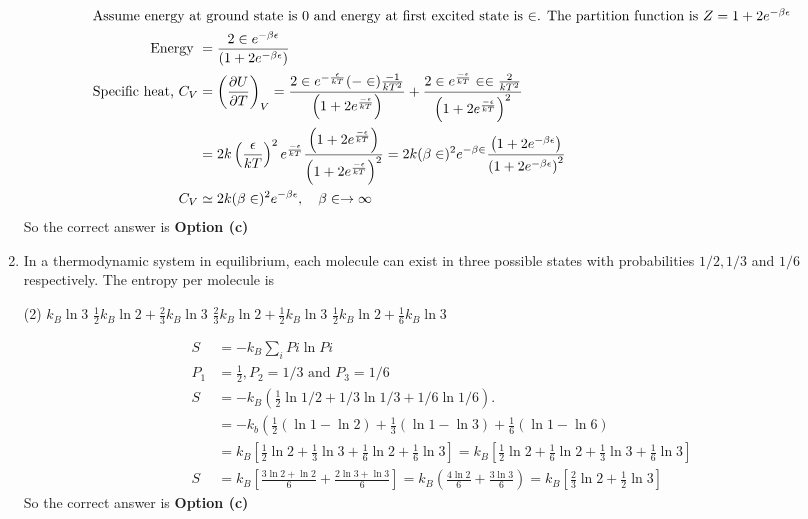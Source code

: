 \begin{enumerate}
\begin{answer}
\begin{align*}
	\intertext{Assume energy at ground state is 0 and energy at first excited state is $\in$. The partition function is $Z=1+2 e^{-\beta \epsilon}$}
\text{	Energy }&=\frac{2 \in e^{-\beta \epsilon}}{\left(1+2 e^{-\beta \epsilon}\right)}\\
	\text{Specific heat, }C_{V}&=\left(\frac{\partial U}{\partial T}\right)_{V}=\frac{2 \in e^{-\frac{\epsilon}{k T}}(-\in) \frac{-1}{k T^{2}}}{\left(1+2 e^{\frac{-\epsilon}{k T}}\right)}+\frac{2 \in e^{\frac{-\epsilon}{k T}} \in \in \frac{2}{k T^{2}}}{\left(1+2 e^{\frac{-\epsilon}{k T}}\right)^{2}}\\
	&=2 k\left(\frac{\epsilon}{k T}\right)^{2} e^{\frac{-\epsilon}{k T}} \frac{\left(1+2 e^{\frac{-\epsilon}{k T}}\right)}{\left(1+2 e^{\frac{-\epsilon}{k T}}\right)^{2}}=2 k(\beta \in)^{2} e^{-\beta \in} \frac{\left(1+2 e^{-\beta \epsilon}\right)}{\left(1+2 e^{-\beta \epsilon}\right)^{2}}\\
	C_{V} &\simeq 2 k(\beta \in)^{2} e^{-\beta \epsilon}, \quad \beta \in \rightarrow \infty
	\end{align*}
		So the correct answer is \textbf{Option (c)}
\end{answer}
\item In a thermodynamic system in equilibrium, each molecule can exist in three possible states with probabilities $1 / 2,1 / 3$ and $1 / 6$ respectively. The entropy per molecule is
{	}
 \begin{tasks}(2)
	\task[\textbf{a.}] $k_{B} \ln 3$
	\task[\textbf{b.}]$\frac{1}{2} k_{B} \ln 2+\frac{2}{3} k_{B} \ln 3$
	\task[\textbf{c.}]$\frac{2}{3} k_{B} \ln 2+\frac{1}{2} k_{B} \ln 3$
	\task[\textbf{d.}] $\frac{1}{2} k_{B} \ln 2+\frac{1}{6} k_{B} \ln 3$
\end{tasks}
\begin{answer}
	\begin{align*}
	S&=-k_{B} \sum_{i} P i \ln P i\\
	P_{1}&=\frac{1}{2}, P_{2}=1 / 3 \text { and } P_{3}=1 / 6 \\
	S&=-k_{B}\left(\frac{1}{2} \ln 1 / 2+1 / 3 \ln 1 / 3+1 / 6 \ln 1 / 6\right) . \\
	&=-k_{b}\left(\frac{1}{2}(\ln 1-\ln 2)+\frac{1}{3}(\ln 1-\ln 3)+\frac{1}{6}(\ln 1-\ln 6)\right. \\
	&=k_{B}\left[\frac{1}{2} \ln 2+\frac{1}{3} \ln 3+\frac{1}{6} \ln 2+\frac{1}{6} \ln 3\right]=k_{B}\left[\frac{1}{2} \ln 2+\frac{1}{6} \ln 2+\frac{1}{3} \ln 3+\frac{1}{6} \ln 3\right] \\
	S&=k_{B}\left[\frac{3 \ln 2+\ln 2}{6}+\frac{2 \ln 3+\ln 3}{6}\right]=k_{B}\left(\frac{4 \ln 2}{6}+\frac{3 \ln 3}{6}\right)=k_{B}\left[\frac{2}{3} \ln 2+\frac{1}{2} \ln 3\right]
	\end{align*}
		So the correct answer is \textbf{Option (c)}
\end{answer}
\end{enumerate}
